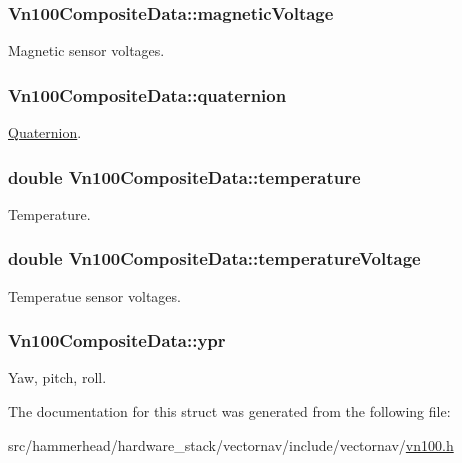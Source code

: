 \subsubsection[{\texorpdfstring{magnetic\+Voltage}{magneticVoltage}}]{ Vn100\+Composite\+Data\+::magnetic\+Voltage}\hypertarget{structVn100CompositeData_a7daa9e416535dcc148b328d6d46c1d03}{}\label{structVn100CompositeData_a7daa9e416535dcc148b328d6d46c1d03}
Magnetic sensor voltages. 
\subsubsection[{\texorpdfstring{quaternion}{quaternion}}]{ Vn100\+Composite\+Data\+::quaternion}\hypertarget{structVn100CompositeData_aa46f1550ab05e5a3fa8f3eefb2dce463}{}\label{structVn100CompositeData_aa46f1550ab05e5a3fa8f3eefb2dce463}
\hyperlink{classQuaternion}{Quaternion}. 
\subsubsection[{\texorpdfstring{temperature}{temperature}}]{\setlength{\rightskip}{0pt plus 5cm}double Vn100\+Composite\+Data\+::temperature}\hypertarget{structVn100CompositeData_aacb5b98b462ae3e4889bd4ea0b59935b}{}\label{structVn100CompositeData_aacb5b98b462ae3e4889bd4ea0b59935b}
Temperature. 
\subsubsection[{\texorpdfstring{temperature\+Voltage}{temperatureVoltage}}]{\setlength{\rightskip}{0pt plus 5cm}double Vn100\+Composite\+Data\+::temperature\+Voltage}\hypertarget{structVn100CompositeData_a6084ecf97f8cde0fcba7a346a3bb1ab6}{}\label{structVn100CompositeData_a6084ecf97f8cde0fcba7a346a3bb1ab6}
Temperatue sensor voltages. 
\subsubsection[{\texorpdfstring{ypr}{ypr}}]{ Vn100\+Composite\+Data\+::ypr}\hypertarget{structVn100CompositeData_ada2b1cd61b346de5f3ecadb7a0a7b864}{}\label{structVn100CompositeData_ada2b1cd61b346de5f3ecadb7a0a7b864}
Yaw, pitch, roll. 

The documentation for this struct was generated from the following file\+:\begin{DoxyCompactItemize}
\item 
src/hammerhead/hardware\+\_\+stack/vectornav/include/vectornav/\hyperlink{vn100_8h}{vn100.\+h}\end{DoxyCompactItemize}

